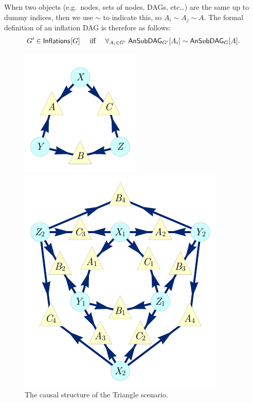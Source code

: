 {When two objects (e.g.~nodes, sets of nodes, DAGs, etc\ldots) are the same up to dummy indices, then we use $\sim$ to indicate this, so $A_i\sim A_j\sim A$. 
The formal definition of an inflation DAG is therefore as follows:
\begin{align}\label{eq:definflationDAG}
G'\in\SmallNamedFunction{Inflations}{G} \quad\text{ iff }\quad \forall_{A_i\in G'}\; \ansubgraph[G']{A_i}\sim\ansubgraph[G]{A}.
\end{align}


\begin{figure}[t]
\centering
\begin{minipage}[b]{0.23\linewidth}
\centering
\includegraphics[scale=1]{TriDagRaw.pdf}
\caption{The causal structure of the Triangle scenario.}\label{fig:TriMainDAG}
\end{minipage}
\hfill
\begin{minipage}[t]{0.38\linewidth}
\centering
\includegraphics[scale=1]{TriDagFull222.pdf}

\end{minipage}
\end{figure}}

